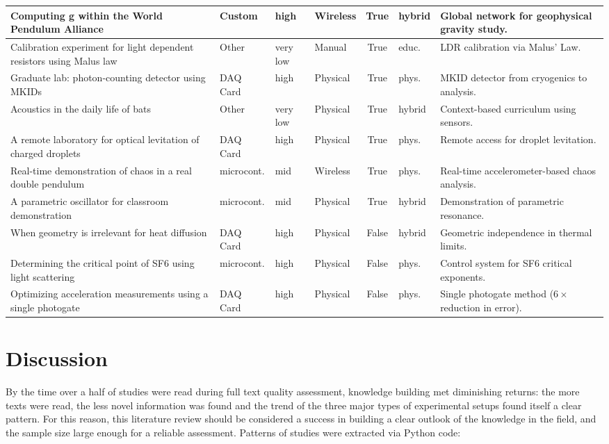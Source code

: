 \documentclass[12pt]{article}
\begin{document}
\begin{xltabular}{\textwidth}{|X|l|l|l|c|l|X|}
    Computing g within the World Pendulum Alliance & Custom & high & Wireless & True & hybrid & Global network for geophysical gravity study. \\ \hline
    Calibration experiment for light dependent resistors using Malus law & Other & very low & Manual & True & educ. & LDR calibration via Malus' Law. \\ \hline
    Graduate lab: photon-counting detector using MKIDs & DAQ Card & high & Physical & True & phys. & MKID detector from cryogenics to analysis. \\ \hline
    Acoustics in the daily life of bats & Other & very low & Physical & True & hybrid & Context-based curriculum using sensors. \\ \hline
    A remote laboratory for optical levitation of charged droplets & DAQ Card & high & Physical & True & phys. & Remote access for droplet levitation. \\ \hline
    Real-time demonstration of chaos in a real double pendulum & microcont. & mid & Wireless & True & phys. & Real-time accelerometer-based chaos analysis. \\ \hline
    A parametric oscillator for classroom demonstration & microcont. & mid & Physical & True & hybrid & Demonstration of parametric resonance. \\ \hline
    When geometry is irrelevant for heat diffusion & DAQ Card & high & Physical & False & hybrid & Geometric independence in thermal limits. \\ \hline
    Determining the critical point of SF6 using light scattering & microcont. & high & Physical & False & phys. & Control system for SF6 critical exponents. \\ \hline
    Optimizing acceleration measurements using a single photogate & DAQ Card & high & Physical & False & phys. & Single photogate method ($6\times$ reduction in error). \\ \hline
\end{xltabular}

\section{Discussion}

By the time over a half of studies were read during full text quality assessment, knowledge building met diminishing returns: the more texts were read, the less novel information was found and the trend of the three major types of experimental setups found itself a clear pattern. For this reason, this literature review should be considered a success in building a clear outlook of the knowledge in the field, and the sample size large enough for a reliable assessment. Patterns of studies were extracted via Python code:
\end{document}
